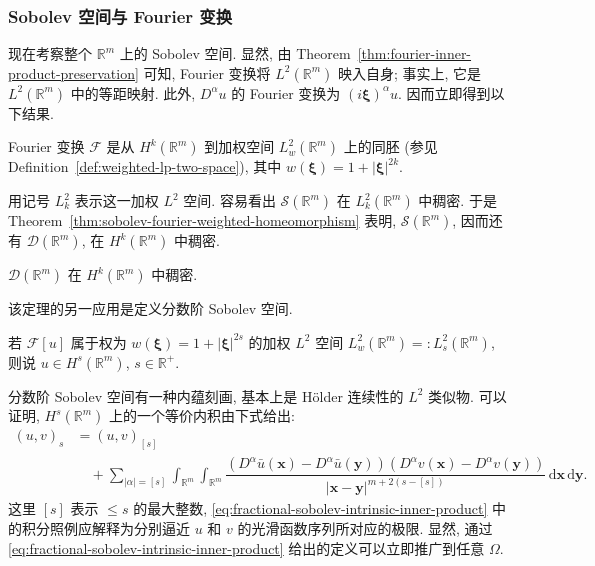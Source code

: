 \subsubsection{Sobolev 空间与 Fourier 变换}\label{subsec:sobolev-fourier-characterization}

现在考察整个 $\mathbb{R}^m$ 上的 Sobolev 空间. 显然, 由 Theorem~\ref{thm:fourier-inner-product-preservation} 可知, Fourier 变换将 $L^2(\mathbb{R}^m)$ 映入自身; 事实上, 它是 $L^2(\mathbb{R}^m)$ 中的等距映射. 此外, $D^\alpha u$ 的 Fourier 变换为 $(i\bm{\xi})^\alpha\hat u$. 因而立即得到以下结果.

\begin{Theorem}
\label{thm:sobolev-fourier-weighted-homeomorphism}
Fourier 变换 $\mathcal{F}$ 是从 $H^k(\mathbb{R}^m)$ 到加权空间 $L_w^2(\mathbb{R}^m)$ 上的同胚 (参见 Definition~\ref{def:weighted-lp-two-space}), 其中 $w(\bm{\xi})=1+|\bm{\xi}|^{2k}$.
\end{Theorem}

用记号 $L_k^2$ 表示这一加权 $L^2$ 空间. 容易看出 $\mathcal{S}(\mathbb{R}^m)$ 在 $L_k^2(\mathbb{R}^m)$ 中稠密. 于是 Theorem~\ref{thm:sobolev-fourier-weighted-homeomorphism} 表明, $\mathcal{S}(\mathbb{R}^m)$, 因而还有 $\mathcal{D}(\mathbb{R}^m)$, 在 $H^k(\mathbb{R}^m)$ 中稠密.

\begin{Corollary}
\label{cor:full-space-test-functions-sobolev-density}
$\mathcal{D}(\mathbb{R}^m)$ 在 $H^k(\mathbb{R}^m)$ 中稠密.
\end{Corollary}

该定理的另一应用是定义分数阶 Sobolev 空间.

\begin{Definition}
\label{def:fractional-order-sobolev-fourier}
若 $\mathcal{F}[u]$ 属于权为 $w(\bm{\xi})=1+|\bm{\xi}|^{2s}$ 的加权 $L^2$ 空间 $L_w^2(\mathbb{R}^m)=:L_s^2(\mathbb{R}^m)$, 则说 $u\in H^s(\mathbb{R}^m)$, $s\in\mathbb{R}^+$.
\end{Definition}

分数阶 Sobolev 空间有一种内蕴刻画, 基本上是 Hölder 连续性的 $L^2$ 类似物. 可以证明, $H^s(\mathbb{R}^m)$ 上的一个等价内积由下式给出:
\begin{equation}\label{eq:fractional-sobolev-intrinsic-inner-product}
\begin{aligned}
(u,v)_s&=(u,v)_{[s]}\\
&\quad+\sum_{|\alpha|=[s]}\int_{\mathbb{R}^m}\int_{\mathbb{R}^m}
\dfrac{(D^\alpha\bar u(\bm{x})-D^\alpha\bar u(\bm{y}))(D^\alpha v(\bm{x})-D^\alpha v(\bm{y}))}{|\bm{x}-\bm{y}|^{m+2(s-[s])}}\,\mathrm{d}\bm{x}\,\mathrm{d}\bm{y}.
\end{aligned}
\end{equation}
这里 $[s]$ 表示 $\leq s$ 的最大整数, \eqref{eq:fractional-sobolev-intrinsic-inner-product} 中的积分照例应解释为分别逼近 $u$ 和 $v$ 的光滑函数序列所对应的极限. 显然, 通过 \eqref{eq:fractional-sobolev-intrinsic-inner-product} 给出的定义可以立即推广到任意 $\Omega$.
